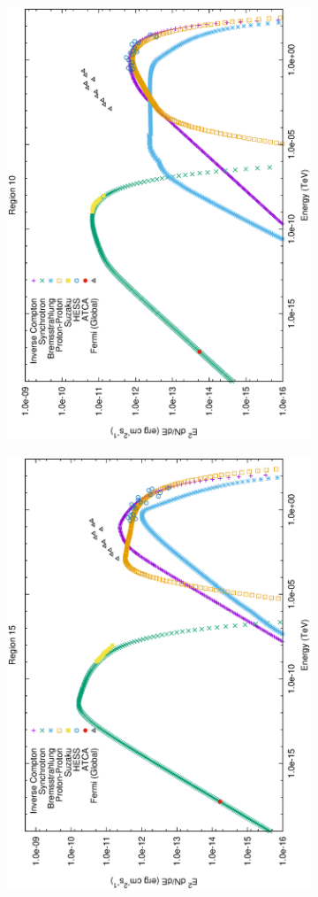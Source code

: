 \documentclass[12pt,a4paper]{article}
\begin{document}
\begin{figure}[H]
\begin{subfigure}{0.5\textwidth}
		\label{fig:rxj1713lephad4}
	\end{subfigure}
	\begin{subfigure}{0.5\textwidth}
		\centering
		\includegraphics[width=0.7\linewidth, height=0.27\textheight, angle=-90]{rxj1713_lephad10}
		\label{fig:rxj1713lephad10}
	\end{subfigure}
	\begin{subfigure}{0.5\textwidth}
		\centering
		\includegraphics[width=0.7\linewidth, height=0.27\textheight, angle=-90]{rxj1713_lephad15}

\end{subfigure}
\end{figure}
\end{document}
